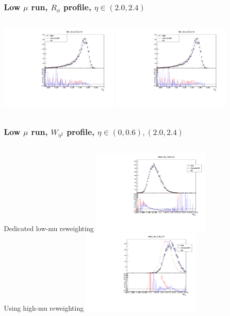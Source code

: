 \documentclass{beamer}
\begin{document}
\begin{frame}
\frametitle{Low $\mu$ run, $R_{\phi}$ profile, $\eta \in (2.0,2.4)$}

\begin{columns}[t]

\centering
{}
\includegraphics[width=6cm]{Rphi_Rew_Eta_20_24_lowmu_13TeV_LocalWB.pdf}
\centering
{}
\includegraphics[width=6cm]{Rphi_Eta_20_24_lowmu_13TeV_AthenaWB.pdf}
\end{columns}
\end{frame}
\begin{frame}
\frametitle{Low $\mu$ run, $W_{\eta^2}$ profile, $\eta \in (0,0.6), (2.0,2.4)$}
\begin{columns}[t]

\centering
\normalsize{Dedicated low-mu reweighting}
\includegraphics[width=6cm]{Weta2_Eta_0_6_lowmu_13TeV_AthenaWB.pdf}\\
\centering
\normalsize{Using high-mu reweighting}
\includegraphics[width=6cm]{Weta2_Eta_20_24_lowmu_13TeV_AthenaWB.pdf}
\end{columns}
\end{frame}
\end{document}

